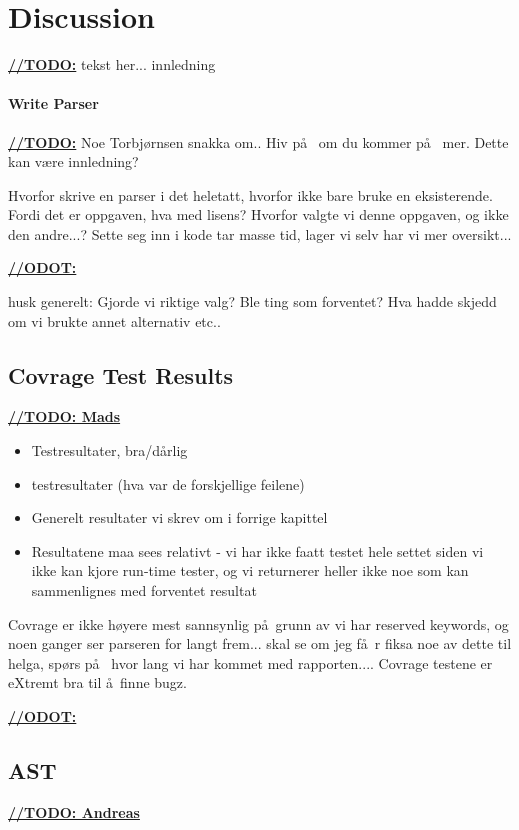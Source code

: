 \chapter{Discussion}
\underline{\textbf{\LARGE //TODO:}} tekst her... innledning
\subsubsection{Write Parser}
\underline{\textbf{\LARGE //TODO:}} Noe Torbj\o rnsen snakka om.. Hiv p\aa~ om du kommer p\aa~ mer. Dette kan v\ae re innledning?

Hvorfor skrive en parser i det heletatt, hvorfor ikke bare bruke en eksisterende. Fordi det er oppgaven, hva med lisens? Hvorfor valgte vi denne oppgaven, og ikke den andre...? Sette seg inn i kode tar masse tid, lager vi selv har vi mer oversikt...

\underline{\textbf{\LARGE //ODOT:}}

husk generelt: Gjorde vi riktige valg? Ble ting som forventet? Hva hadde skjedd om vi brukte annet alternativ etc..





\section{Covrage Test Results}

\underline{\textbf{\LARGE //TODO: Mads}}
\begin{itemize}
\item Testresultater, bra/d\aa rlig
\item testresultater (hva var de forskjellige feilene)
\item Generelt resultater vi skrev om i forrige kapittel
\item Resultatene maa sees relativt - vi har ikke faatt testet hele settet siden
vi ikke kan kjore run-time tester, og vi returnerer heller ikke noe som kan
sammenlignes med forventet resultat
\end{itemize}

Covrage er ikke h\o yere mest sannsynlig p\aa~grunn av vi har reserved keywords, og noen ganger ser parseren for langt frem... skal se om jeg f\aa~r fiksa noe av dette til helga, sp\o rs p\aa~ hvor lang vi har kommet med rapporten.... Covrage testene er eXtremt bra til \aa~finne bugz.

\underline{\textbf{\LARGE //ODOT:}}

\section{AST}
\underline{\textbf{\LARGE //TODO: Andreas}}


